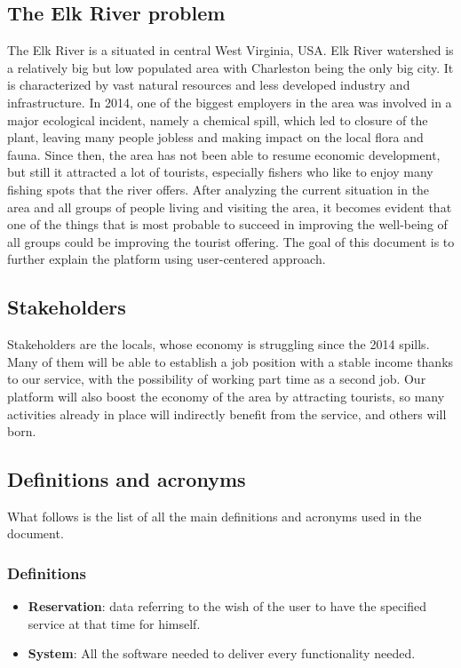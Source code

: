 \subsection{The Elk River problem}
The Elk River is a situated in central West Virginia, USA. Elk River watershed is a relatively big but low populated area with Charleston being the only big city. It is characterized by vast natural resources and less developed industry and infrastructure. In 2014, one of the biggest employers in the area was involved in a major ecological incident, namely a chemical spill, which led to closure of the plant, leaving many people jobless and making impact on the local flora and fauna. Since then, the area has not been able to resume economic development, but still it attracted a lot of tourists, especially fishers who like to enjoy many fishing spots that the river offers. After analyzing the current situation in the area and all groups of people living and visiting the area, it becomes evident that one of the things that is most probable to succeed in improving the well-being of all groups could be improving the tourist offering. The goal of this document is to further explain the platform using user-centered approach.
\subsection{Stakeholders}
Stakeholders are the locals, whose economy is struggling since the 2014 spills. Many of them will be able to establish a job position with a stable income thanks to our service, with the possibility of working part time as a second job. Our platform will also boost the economy of the area by attracting tourists, so many activities already in place will indirectly benefit from the service, and others will born.
\subsection{Definitions and acronyms}
What follows is the list of all the main definitions and acronyms used in the document.
\subsubsection{Definitions}
\begin{itemize}
\item \textbf{Reservation}: data referring to the wish of the user to have the specified service at that time for himself.
\item \textbf{System}: All the software needed to deliver every functionality needed.
\end{itemize}
